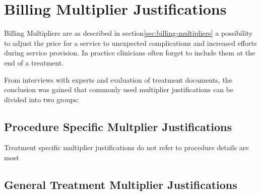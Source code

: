 \section{Billing Multiplier Justifications}
Billing Multipliers are as described in section\ref{sec:billing-multipliers} a possibility to adjust the price for a service to unexpected complications and increased efforts during service provision.
In practice clinicians often forget to include them at the end of a treatment.

From interviews with experts and evaluation of treatment documents, the conclusion was gained that commonly used multiplier justifications can be divided into two groups:
\subsection{Procedure Specific Multplier Justifications}

Treatment specific multiplier justifications do not refer to procedure details are most


\subsection{General Treatment Multiplier Justifications}


